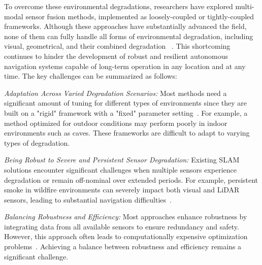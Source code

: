 To overcome these environmental degradations, researchers have explored multi-modal sensor fusion methods, implemented as loosely-coupled \cite{shen,wan2001unscented,zhang2014loam,zhang2015visual,complementaryodometry,camurri2020pronto} or tightly-coupled \cite{graeter2018limo,zuo2019lic,wisth2021unified,r3live} frameworks. Although these approaches have substantially advanced the field,
none of them can fully handle all forms of environmental degradation, including visual, geometrical, and their combined degradation ~\cite{zhao2024subt}. 
This shortcoming continues to hinder the development of robust and resilient autonomous navigation systems capable of long-term operation in any location and at any time.
The key challenges can be summarized as follows: 


\textit{Adaptation Across Varied Degradation Scenarios:}
Most methods need a significant amount of tuning for different types of environments since they are built on a "rigid" framework with a "fixed" parameter setting~\cite{cadena2016past}. For example, a method optimized for outdoor conditions may perform poorly in indoor environments such as caves.  These frameworks are difficult to adapt to varying types of degradation.



\textit{Being Robust to Severe and Persistent Sensor Degradation:}
Existing SLAM solutions encounter significant challenges when multiple sensors experience degradation or remain off-nominal over extended periods. For example, persistent smoke in wildfire environments can severely impact both visual and LiDAR sensors, leading to substantial navigation difficulties~\cite{ebadi2023present}. 

\textit{Balancing Robustness and Efficiency:}
Most approaches enhance robustness by integrating data from all available sensors to ensure redundancy and safety. However, this approach often leads to computationally expensive optimization problems~\cite{cadena2016past}. Achieving a balance between robustness and efficiency remains a significant challenge.


